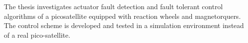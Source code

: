 The thesis investigates actuator fault detection and fault tolerant control
algorithms of a picosatellite equipped with reaction wheels and
magnetorquers.
The control scheme is developed and tested in a simulation environment
instead of a real pico-satellite.